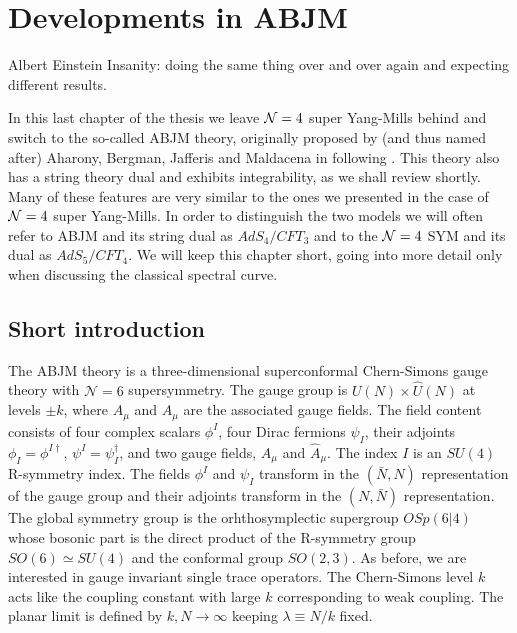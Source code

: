 
\section{Developments in ABJM}
\label{sec:abjm}

\begin{chapquote}{Albert Einstein}
Insanity: doing the same thing over and over again and expecting different results.
\end{chapquote}

\noindent
In this last chapter of the thesis we leave $\mathcal{N}=4$ super Yang-Mills behind and switch to the so-called ABJM theory, originally proposed by (and thus named after) Aharony, Bergman, Jafferis and Maldacena in \cite{Aharony:2008ug} following \cite{Schwarz:2004yj,Schwarz:2004yj1,Schwarz:2004yj2,Bagger:2006sk,Gustavsson:2007vu}.
This theory also has a string theory dual and exhibits integrability, as we shall review shortly.
Many of these features are very similar to the ones we presented in the case of $\mathcal{N}=4$ super Yang-Mills.
In order to distinguish the two models we will often refer to ABJM and its string dual as $AdS_4/CFT_3$ and to the $\mathcal{N}=4$ SYM and its dual as $AdS_5/CFT_4$. 
We will keep this chapter short, going into more detail only when discussing the classical spectral curve.  


\subsection{Short introduction}
\label{sec:abjm_intro}

The ABJM theory is a three-dimensional superconformal Chern-Simons gauge theory with $\mathcal{N}=6$ supersymmetry. 
The gauge group is $U(N) \times \hat{U}(N)$ at levels $\pm k$, where $A_{\mu}$ and $\hat{A}_{\mu}$ are the associated gauge fields.
The field content consists of four complex scalars $\phi^I$, four Dirac fermions $\psi_I$, their adjoints $\phi_I=\phi^{I\dagger}$, $\psi^I=\psi_I^\dagger$, and two gauge fields, $A_\mu$ and $\hat{A}_\mu$. 
The index $I$ is an $SU(4)$ R-symmetry index.  
The fields $\phi^I$ and $\psi_I$ transform in the $(\bar{N},N)$ representation of the gauge group and their adjoints transform in the $(N,\bar{N})$ representation. 
The global symmetry group is the orhthosymplectic supergroup $OSp(6|4)$ whose bosonic part is the direct product of the R-symmetry group $SO(6) \simeq SU(4)$ and the conformal group $SO(2,3)$.
As before, we are interested in gauge invariant single trace operators.
The Chern-Simons level $k$ acts like the coupling constant with large $k$ corresponding to weak coupling.
The planar limit is defined by $k, N \to \infty$ keeping $\lambda \equiv N/k$ fixed.

